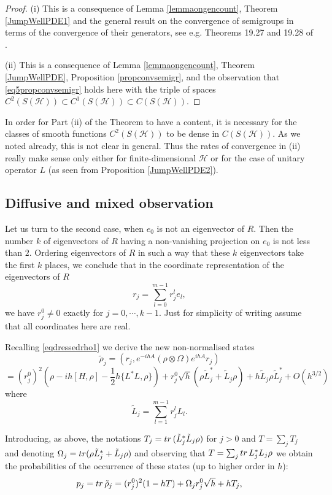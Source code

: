 \documentclass[10pt,a4paper]{amsart}
\def\HC{\mathcal{H}}
\def\tr{\rm{tr}}
\newcommand{\Om}{\Omega}
\begin{document}
\begin{proof}
(i) This is a consequence of Lemma \ref{lemmaongencount}, Theorem \ref{JumpWellPDE1}
 and the general result on the convergence
of semigroups in terms of the convergence of their generators, see e.g. Theorems 19.27 and  19.28 of \cite{Kallen}.

(ii) This is a consequence of Lemma \ref{lemmaongencount}, Theorem \ref{JumpWellPDE}, Proposition \ref{propconvsemigr},
and the observation that \eqref{eq5propconvsemigr}
holds here with  the triple of spaces $C^2(S(\HC))\subset C^1(S(\HC)) \subset C(S(\HC))$.
\end{proof}


In order for Part (ii) of the Theorem to have a content, it is necessary for the classes
of smooth functions  $C^2(S(\HC))$  to be dense in $C(S(\HC))$. As we noted already, this is not clear in general.
Thus the rates of convergence in (ii) really make sense only either for finite-dimensional $\HC$ or for the case
of unitary operator $L$ (as seen from Proposition \ref{JumpWellPDE2}).


\subsection{Diffusive and mixed observation}
\label{secdifcase}

Let us turn to the second case, when $e_0$ is not an eigenvector of $R$.
Then the number $k$ of eigenvectors of $R$ having a non-vanishing projection
on $e_0$ is not less than $2$. Ordering eigenvectors of $R$ in such a way that
these $k$ eigenvectors take the first $k$ places, we conclude that in the
coordinate representation of the eigenvectors of $R$
\[
r_j=\sum_{l=0}^{m-1} r_j^l e_l,
\]
we have $r_j^0\neq 0$ exactly for $j=0, \cdots, k-1$.
Just for simplicity of writing assume that all coordinates here are real.

Recalling \eqref{eqdressedrho1} we derive the
new non-normalised states
\[
\tilde \rho_j =(r_j, e^{-ihA} (\rho\otimes \Om) e^{ihA} r_j)
\]
\[
=(r_j^0)^2 (\rho -ih[H, \rho] -\frac12 h\{L^*L,\rho\})
+r^0_j \sqrt h (\rho \tilde L_j^*+\tilde L_j \rho)+h\tilde L_j \rho \tilde L_j^*
+O(h^{3/2})
\]
where
\[
\tilde L_j= \sum_{l=1}^{m-1} r^l_j L_l.
\]

Introducing, as above, the notations $T_j={\tr}\, (\tilde L_j^* \tilde L_j \rho)$ for $j>0$ and $T=\sum_j T_j$
and denoting $\Om_j=  {\tr} (\rho \tilde L_j^* + \tilde L_j\rho)$ and observing that
$T=\sum_j {\tr} \, L_j^* L_j\rho $ we obtain
the probabilities of the occurrence of these states (up to higher order in $h$):
\[
p_j={\tr} \, \tilde \rho_j=(r_j^0)^2  (1-hT)+\Om_j r^0_j \sqrt h  +h T_j,
\]
\end{document}
